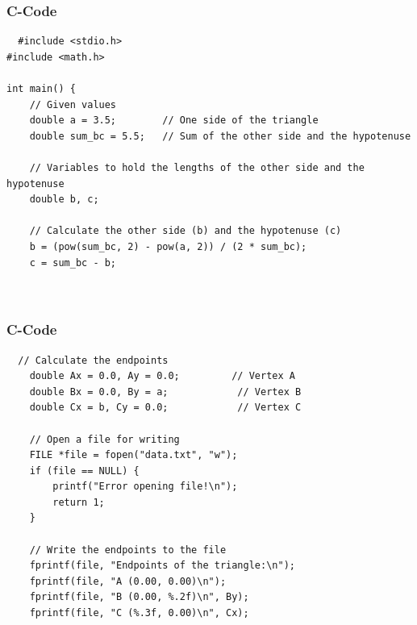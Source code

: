 \documentclass{beamer}
\begin{document}
\begin{frame}[fragile]
\frametitle{C-Code}
\begin{verbatim}
  #include <stdio.h>
#include <math.h>

int main() {
    // Given values
    double a = 3.5;        // One side of the triangle
    double sum_bc = 5.5;   // Sum of the other side and the hypotenuse

    // Variables to hold the lengths of the other side and the hypotenuse
    double b, c;

    // Calculate the other side (b) and the hypotenuse (c)
    b = (pow(sum_bc, 2) - pow(a, 2)) / (2 * sum_bc);
    c = sum_bc - b;

   

\end{verbatim}
\end{frame}
\begin{frame}[fragile]
\frametitle{C-Code}
\begin{verbatim}
  // Calculate the endpoints
    double Ax = 0.0, Ay = 0.0;         // Vertex A
    double Bx = 0.0, By = a;            // Vertex B
    double Cx = b, Cy = 0.0;            // Vertex C

    // Open a file for writing
    FILE *file = fopen("data.txt", "w");
    if (file == NULL) {
        printf("Error opening file!\n");
        return 1;
    }

    // Write the endpoints to the file
    fprintf(file, "Endpoints of the triangle:\n");
    fprintf(file, "A (0.00, 0.00)\n");
    fprintf(file, "B (0.00, %.2f)\n", By);
    fprintf(file, "C (%.3f, 0.00)\n", Cx);

   
\end{verbatim}
\end{frame}
\end{document}
